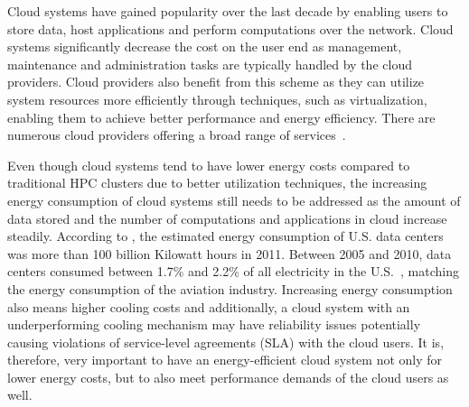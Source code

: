 Cloud systems have gained popularity over the last decade by enabling users to store data, host
applications and perform computations over the network. Cloud systems significantly decrease
the cost on the user end as management, maintenance and administration tasks are typically
handled by the cloud providers. Cloud providers also benefit from this scheme as they can
utilize system resources more efficiently through techniques, such as virtualization, enabling them
to achieve better performance and energy efficiency. There are numerous cloud providers
offering a broad range of services~\cite{googlece, aws, azure}.

Even though cloud systems tend to have lower energy costs compared to traditional HPC clusters
due to better utilization techniques, the increasing energy consumption of cloud systems still
needs to be addressed as the amount of data stored and the number of computations and applications
in cloud increase steadily. According to \cite{Kaushik:2010:LSE:1851476.1851523}, the estimated
energy consumption of U.S. data centers was more than 100 billion Kilowatt hours in 2011.
Between 2005 and 2010, data centers consumed between 1.7\% and 2.2\% of all electricity in the
U.S.~\cite{koomey2011growth}, matching the energy consumption of the aviation industry.
Increasing energy consumption also means higher cooling costs and additionally, a cloud system with an
underperforming cooling mechanism may have reliability issues potentially causing violations of
service-level agreements (SLA) with the cloud users. It is, therefore, very important to have an
energy-efficient cloud system not only for lower energy costs, but to also meet performance
demands of the cloud users as well.

